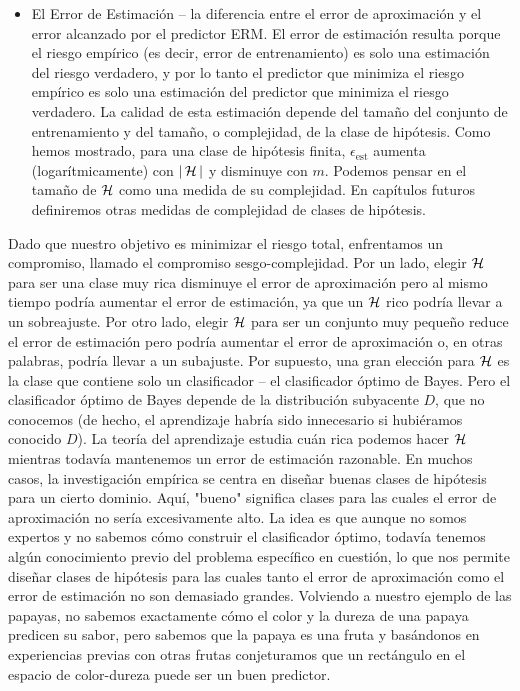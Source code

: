 \begin{teo}
\begin{itemize}
  \item El Error de Estimación – la diferencia entre el error de aproximación y el error alcanzado por el predictor ERM. El error de estimación resulta porque el riesgo empírico (es decir, error de entrenamiento) es solo una estimación del riesgo verdadero, y por lo tanto el predictor que minimiza el riesgo empírico es solo una estimación del predictor que minimiza el riesgo verdadero.
  La calidad de esta estimación depende del tamaño del conjunto de entrenamiento y del tamaño, o complejidad, de la clase de hipótesis. Como hemos mostrado, para una clase de hipótesis finita, $\epsilon_{\text{est}}$ aumenta (logarítmicamente) con $|\mathop{\mbox{$\mathcal{H}$}}\nolimits|$ y disminuye con $m$. Podemos pensar en el tamaño de $\mathop{\mbox{$\mathcal{H}$}}\nolimits$ como una medida de su complejidad.
  En capítulos futuros definiremos otras medidas de complejidad de clases de hipótesis.
\end{itemize}
Dado que nuestro objetivo es minimizar el riesgo total, enfrentamos un compromiso, llamado el compromiso sesgo-complejidad. Por un lado, elegir $\mathop{\mbox{$\mathcal{H}$}}\nolimits$ para ser una clase muy rica disminuye el error de aproximación pero al mismo tiempo podría aumentar el error de estimación, ya que un $\mathop{\mbox{$\mathcal{H}$}}\nolimits$ rico podría llevar a un sobreajuste. Por otro lado, elegir $\mathop{\mbox{$\mathcal{H}$}}\nolimits$ para ser un conjunto muy pequeño reduce el error de estimación pero podría aumentar el error de aproximación o, en otras palabras, podría llevar a un subajuste. Por supuesto, una gran elección para $\mathop{\mbox{$\mathcal{H}$}}\nolimits$ es la clase que contiene solo un clasificador – el clasificador óptimo de Bayes. Pero el clasificador óptimo de Bayes depende de la distribución subyacente $D$, que no conocemos (de hecho, el aprendizaje habría sido innecesario si hubiéramos conocido $D$).
La teoría del aprendizaje estudia cuán rica podemos hacer $\mathop{\mbox{$\mathcal{H}$}}\nolimits$ mientras todavía mantenemos un error de estimación razonable. En muchos casos, la investigación empírica se centra en diseñar buenas clases de hipótesis para un cierto dominio. Aquí, "bueno" significa clases para las cuales el error de aproximación no sería excesivamente alto. La idea es que aunque no somos expertos y no sabemos cómo construir el clasificador óptimo, todavía tenemos algún conocimiento previo del problema específico en cuestión, lo que nos permite diseñar clases de hipótesis para las cuales tanto el error de aproximación como el error de estimación no son demasiado grandes. Volviendo a nuestro ejemplo de las papayas, no sabemos exactamente cómo el color y la dureza de una papaya predicen su sabor, pero sabemos que la papaya es una fruta y basándonos en experiencias previas con otras frutas conjeturamos que un rectángulo en el espacio de color-dureza puede ser un buen predictor.


\end{teo}
